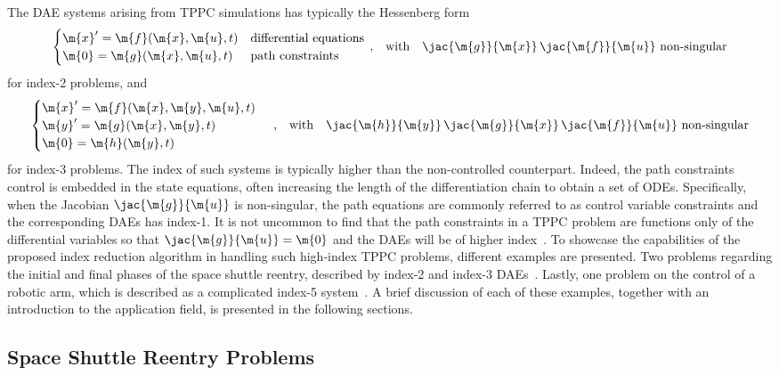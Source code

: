 The \ac{DAE} systems arising from \ac{TPPC} simulations has typically the Hessenberg form~\cite{brenan1986numerical}
%
\begin{equation*}
  \begin{cases}
    \m{x}^\prime = \m{f}(\m{x}, \m{u}, t) & \text{differential equations} \\
    \m{0}        = \m{g}(\m{x}, \m{u}, t) & \text{path constraints}
  \end{cases} \, \text{,}
  \quad \text{with} \quad \jac{\m{g}}{\m{x}} \, \jac{\m{f}}{\m{u}} ~ \text{non-singular}
  \label{chap5:eq:tppc_dae_index2}
\end{equation*}
%
for index-2 problems, and
%
\begin{equation*}
  \begin{cases}
    \m{x}^\prime = \m{f}(\m{x}, \m{y}, \m{u}, t) \\
    \m{y}^\prime = \m{g}(\m{x}, \m{y}, t) \\
    \m{0}        = \m{h}(\m{y}, t)
  \end{cases} \, \text{,}
  \quad \text{with} \quad \jac{\m{h}}{\m{y}} \, \jac{\m{g}}{\m{x}} \, \jac{\m{f}}{\m{u}} ~ \text{non-singular}
  \label{chap5:eq:tppc_dae_index3}
\end{equation*}
%
for index-3 problems. The index of such systems is typically higher than the non-controlled counterpart. Indeed, the path constraints control is embedded in the state equations, often increasing the length of the differentiation chain to obtain a set of \acp{ODE}. Specifically, when the Jacobian $\jac{\m{g}}{\m{u}}$ is non-singular, the path equations are commonly referred to as control variable constraints and the corresponding \acp{DAE} has index-1. It is not uncommon to find that the path constraints in a \ac{TPPC} problem are functions only of the differential variables so that $\jac{\m{g}}{\m{u}} = \m{0}$ and the \acp{DAE} will be of higher index~\cite{brenan1995numerical}. To showcase the capabilities of the proposed index reduction algorithm in handling such high-index \ac{TPPC} problems, different examples are presented. Two problems regarding the initial and final phases of the space shuttle reentry, described by index-2 and index-3 \acp{DAE}~\cite{brenan1995numerical}. Lastly, one problem on the control of a robotic arm, which is described as a complicated index-5 system~\cite{pryce1998solving}. A brief discussion of each of these examples, together with an introduction to the application field, is presented in the following sections.

\subsection{Space Shuttle Reentry Problems}

